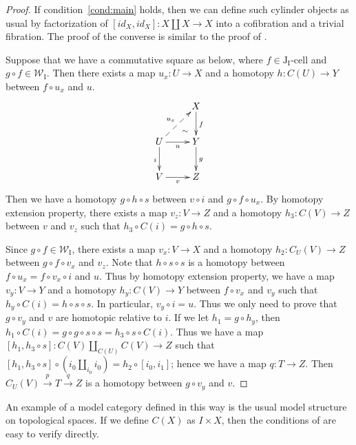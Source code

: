 \documentclass[reqno]{amsart}
\theoremstyle{definition}
\newcommand{\we}{\mathcal{W}}
\newcommand{\I}{\mathrm{I}}
\newcommand{\J}{\mathrm{J}}
\newcommand{\class}[2]{#1\text{-}\mathrm{#2}}
\newcommand{\Icell}[1][\I]{\class{#1}{cell}}
\newcommand{\Jcell}[1][]{\Icell[\J#1]}
\newcommand{\cyli}{i}
\begin{document}
\begin{proof}
If condition~\eqref{cond:main} holds, then we can define such cylinder objects as usual by factorization of $[id_X,id_X] : X \amalg X \to X$ into a cofibration and a trivial fibration.
The proof of the converse is similar to the proof of .

Suppose that we have a commutative square as below, where $f \in \Jcell[_\I]$ and $g \circ f \in \we_\I$.
Then there exists a map $u_x : U \to X$ and a homotopy $h : C(U) \to Y$ between $f \circ u_x$ and $u$.
\[ \xymatrix{   \ar@{}[dr]|(.7){\sim}                 & X \ar[d]^f \\
              U \ar@{-->}[ur]^{u_x} \ar[d]_i \ar[r]_u & Y \ar[d]^g \\
              V \ar[r]_v                              & Z
            } \]
Then we have a homotopy $g \circ h \circ s$ between $v \circ i$ and $g \circ f \circ u_x$.
By homotopy extension property, there exists a map $v_z : V \to Z$ and a homotopy $h_3 : C(V) \to Z$ between $v$ and $v_z$ such that $h_3 \circ C(i) = g \circ h \circ s$.

Since $g \circ f \in \we_\I$, there exists a map $v_x : V \to X$ and a homotopy $h_2 : C_U(V) \to Z$ between $g \circ f \circ v_x$ and $v_z$.
Note that $h \circ s \circ s$ is a homotopy between $f \circ u_x = f \circ v_x \circ i$ and $u$.
Thus by homotopy extension property, we have a map $v_y : V \to Y$ and a homotopy $h_y : C(V) \to Y$ between $f \circ v_x$ and $v_y$ such that $h_y \circ C(i) = h \circ s \circ s$.
In particular, $v_y \circ i = u$.
Thus we only need to prove that $g \circ v_y$ and $v$ are homotopic relative to $i$.
If we let $h_1 = g \circ h_y$, then $h_1 \circ C(i) = g \circ g \circ s \circ s = h_3 \circ s \circ C(i)$.
Thus we have a map $[h_1, h_3 \circ s] : C(V) \amalg_{C(U)} C(V) \to Z$ such that $[h_1, h_3 \circ s] \circ (\cyli_0 \amalg_{\cyli_0} \cyli_0) = h_2 \circ [\cyli_0,\cyli_1]$;
hence we have a map $q : T \to Z$.
Then $C_U(V) \xrightarrow{p} T \xrightarrow{q} Z$ is a homotopy between $g \circ v_y$ and $v$.
\end{proof}

\begin{example}
An example of a model category defined in this way is the usual model structure on topological spaces.
If we define $C(X)$ as $I \times X$, then the conditions of  are easy to verify directly.
\end{example}



\end{document}
